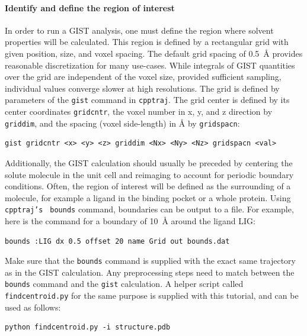 \documentclass[9pt,tutorial]{livecoms}
\newcommand{\software}{\texttt}
\newcommand\inlinecode{\texttt}
\begin{document}
\paragraph{Identify and define the region of interest}
In order to run a GIST analysis, one must define the region where solvent properties will be calculated.
This region is defined by a rectangular grid with given position, size, and voxel spacing.
The default grid spacing of \SI{0.5}{\angstrom} provides reasonable discretization for many use-cases.
While integrals of GIST quantities over the grid are independent of the voxel size, provided sufficient sampling, individual values converge slower at high resolutions.
The grid is defined by parameters of the \inlinecode{gist} command in \software{cpptraj}.
The grid center is defined by its center coordinates \inlinecode{gridcntr}, the voxel number in x, y, and z direction by \inlinecode{griddim}, and the spacing (voxel side-length) in \AA{} by \inlinecode{gridspacn}:

\begin{lstlisting}[style=cpptraj]
gist gridcntr <x> <y> <z> griddim <Nx> <Ny> <Nz> gridspacn <val>
\end{lstlisting}
Additionally, the GIST calculation should usually be preceded by centering the solute molecule in the unit cell and reimaging to account for periodic boundary conditions.
Often, the region of interest will be defined as the surrounding of a molecule, for example a ligand in the binding pocket or a whole protein. 
Using \inlinecode{cpptraj's } \inlinecode{bounds} command, boundaries can be output to a file. For example, here is the command for a boundary of \SI{10}{\angstrom} around the ligand LIG:

\begin{lstlisting}[style=cpptraj]
bounds :LIG dx 0.5 offset 20 name Grid out bounds.dat
\end{lstlisting}
\begin{minipage}{\linewidth} %
Make sure that the \inlinecode{bounds} command is supplied with the exact same trajectory as in the GIST calculation. Any preprocessing steps need to match between the \inlinecode{bounds} command and the \inlinecode{gist} calculation. A helper script called \inlinecode{findcentroid.py} for the same purpose is supplied with this tutorial, and can be used as follows:
~
\begin{lstlisting}[style=bash]
python findcentroid.py -i structure.pdb
\end{lstlisting}
\end{minipage}
\end{document}
